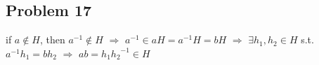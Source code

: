 \subsection*{Problem 17}
\noindent if $a \notin H$, then $a^{-1} \notin H$ $\Rightarrow$ $a^{-1} \in aH = a^{-1}H = bH$ $\Rightarrow$ $\exists h_1, h_2 \in H$ s.t. $a^{-1}h_1 = bh_2$ $\Rightarrow$ $ab = h_1{h_2}^{-1} \in H$

